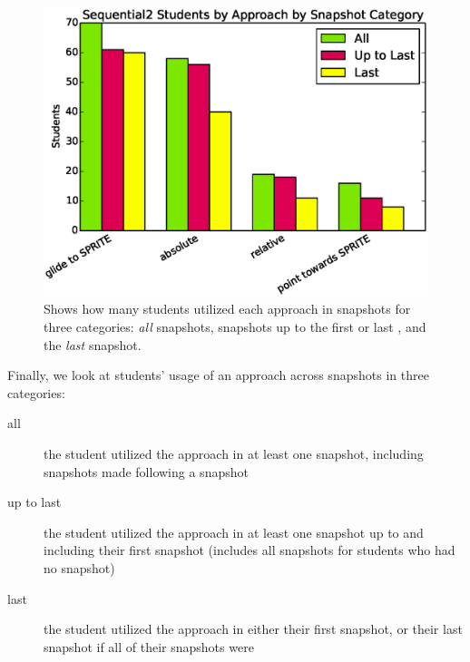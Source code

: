 \begin{figure}[!t]
\centering \includegraphics[width=5.25in]{graphs/approach_bar_Sequential2.eps}
\caption{Shows how many students utilized each approach in \stwo{} snapshots
  for three categories: \emph{all} snapshots, snapshots up to the first \com{}
  or last \incom{}, and the \emph{last} snapshot.}
\end{figure}

Finally, we look at students' usage of an approach across snapshots in three
categories:

\begin{description}
\item[all] the student utilized the approach in at least one snapshot,
  including snapshots made following a \com{} snapshot
\item[up to last] the student utilized the approach in at least one snapshot up
  to and including their first \com{} snapshot (includes all snapshots for
  students who had no \com{} snapshot)
\item[last] the student utilized the approach in either their first \com{}
  snapshot, or their last snapshot if all of their snapshots were \incom{}
\end{description}

